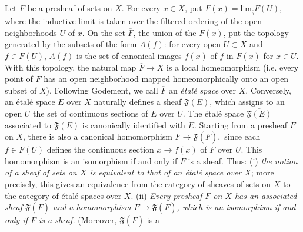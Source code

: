 Let $F$ be a presheaf of sets on $X$. For every $x\in X$, put
$F(x)=\underset{\to}{\mathrm{lim.}}F(U),$
where the inductive limit is taken over the filtered ordering of the open
neighborhoods $U$ of $x$. On the set $\overline F$, the union of the $F(x)$,
put the topology generated by the subsets of the form $A(f)$: for every open
$U\subset X$ and $f\in F(U)$, $A(f)$ is the set of canonical images $f(x)$ of
$f$ in $F(x)$ for $x\in U$. With this topology, the natural map
$\overline F\to X$ is a local homeomorphism (i.e. every point of $\overline F$ has an open
neighborhood mapped homeomorphically onto an open subset of $X$). Following Godement,
we call $\overline F$ an \textit{étalé space} over $X$.
Conversely, an étalé space $E$ over $X$ naturally defines a sheaf
$\mathfrak F(E)$, which assigns to an open $U$ the set of continuous sections
of $E$ over $U$. The étalé space $\overline{\mathfrak F(E)}$ associated to
$\mathfrak F(E)$ is canonically identified with $E$. Starting from a
presheaf $F$ on $X$, there is also a canonical homomorphism
$F\to\mathfrak F(\overline F),$
since each $f\in F(U)$ defines the continuous section
$x\to f(x)$ of $\overline F$ over $U$. This homomorphism is an
isomorphism if and only if $F$ is a sheaf. Thus: (i) \textit{the notion of a
sheaf of sets on $X$ is equivalent to that of an étalé space over $X$}; more
precisely, this gives an equivalence from the category of sheaves of sets on
$X$ to the category of étalé spaces over $X$.
(ii) \textit{Every presheaf $F$ on $X$ has an associated sheaf
$\mathfrak F(\overline F)$ and a homomorphism
$F\to\mathfrak F(\overline F)$, which is an isomorphism if and
only if $F$ is a sheaf.} (Moreover, $\mathfrak F(\overline F)$ is a


